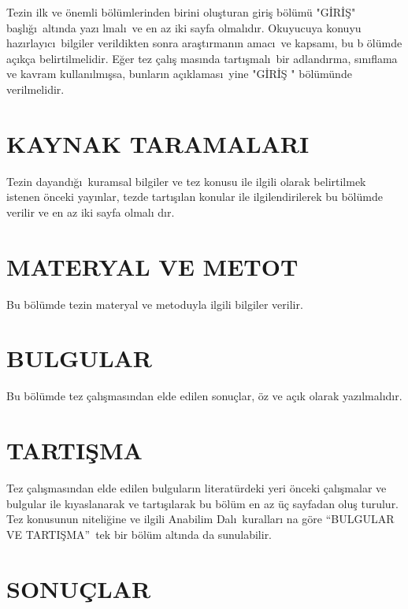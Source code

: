\documentclass[fleqn,oneside]{akdenizuni}
\theoremstyle{plain}
\theoremstyle{definition}
\begin{document}
Tezin ilk ve \"{o}nemli b\"{o}l\"{u}mlerinden birini olu\c{s}turan giri\c{s}
b\"{o}l\"{u}m\"{u} "G\.{I}R\.{I}\c{S}" ba\c{s}l\i \u{g}\i\ alt\i nda yaz\i
lmal\i\ ve en az iki sayfa olmal\i d\i r. Okuyucuya konuyu haz\i rlay\i c\i\
bilgiler verildikten sonra ara\c{s}t\i rman\i n amac\i\ ve kapsam\i , bu b%
\"{o}l\"{u}mde a\c{c}\i k\c{c}a belirtilmelidir. E\u{g}er tez \c{c}al\i \c{s}%
mas\i nda tart\i \c{s}mal\i\ bir adland\i rma, s\i n\i flama ve kavram
kullan\i lm\i \c{s}sa, bunlar\i n a\c{c}\i klamas\i\ yine "G\.{I}R\.{I}\c{S}%
" b\"{o}l\"{u}m\"{u}nde verilmelidir.

\chapter{KAYNAK TARAMALARI}

Tezin dayand\i \u{g}\i\ kuramsal bilgiler ve tez konusu ile ilgili olarak
belirtilmek istenen \"{o}nceki yay\i nlar, tezde tart\i \c{s}\i lan konular
ile ilgilendirilerek bu b\"{o}l\"{u}mde verilir ve en az iki sayfa olmal\i
d\i r.

\chapter{MATERYAL VE METOT}

Bu b\"{o}l\"{u}mde tezin materyal ve metoduyla ilgili bilgiler verilir.

\chapter{BULGULAR}

Bu b\"{o}l\"{u}mde tez \c{c}al\i \c{s}mas\i ndan elde edilen sonu\c{c}lar, 
\"{o}z ve a\c{c}\i k olarak yaz\i lmal\i d\i r.

\chapter{TARTI\c{S}MA}

Tez \c{c}al\i \c{s}mas\i ndan elde edilen bulgular\i n literat\"{u}rdeki
yeri \"{o}nceki \c{c}al\i \c{s}malar ve bulgular ile k\i yaslanarak ve
tart\i \c{s}\i larak bu b\"{o}l\"{u}m en az \"{u}\c{c} sayfadan olu\c{s}%
turulur. Tez konusunun niteli\u{g}ine ve ilgili Anabilim Dal\i\ kurallar\i
na g\"{o}re \textquotedblleft BULGULAR VE TARTI\c{S}MA\textquotedblright\
tek bir b\"{o}l\"{u}m alt\i nda da sunulabilir.

\chapter{SONU\c{C}LAR}
\end{document}
